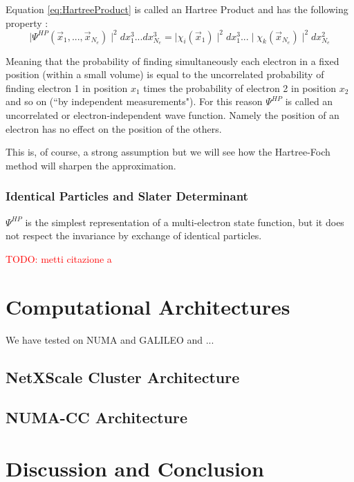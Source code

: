 \documentclass[a4paper,12pt]{article}
\newcommand\mynotes[1]{\begin{flushright}\textcolor{red}{TODO: #1}\end{flushright}}
\begin{document}
Equation \eqref{eq:HartreeProduct} is called an Hartree Product and has the following property :
\begin{equation}\label{eq:uncorrelated}
	\mid\Psi^{HP}(\vec{x}_1,...,\vec{x}_{N_e}) \mid^2 dx_1^3 ... dx_{N_e}^3 = \mid\chi_i(\vec{x}_1)\mid^2 dx_1^3 ...\mid \chi_k(\vec{x}_{N_e})\mid^2 dx_{N_e}^2
\end{equation}

Meaning that the probability of finding simultaneously each electron in a fixed position (within a small volume) is equal to the uncorrelated probability of finding electron 1 in position $x_1$ times the probability of electron 2 in position $x_2$ and so on (``by independent measurements").
For this reason $\Psi^{HP}$ is called an uncorrelated or electron-independent wave function. Namely the position of an electron has no effect on the position of the others. 

This is, of course, a strong assumption but we will see how the Hartree-Foch method will sharpen the approximation.

\subsubsection{Identical Particles and Slater Determinant}

$\Psi^{HP}$ is the simplest representation of a multi-electron state function, but it does not respect the invariance by exchange of identical particles.





\mynotes{metti citazione a \cite{Dan}}



\section{Computational Architectures} \label{comparch:sec}


We have tested on NUMA and GALILEO and ...


\subsection{NetXScale Cluster Architecture}\label{galileoarch:sec}
\subsection{NUMA-CC Architecture}\label{numaarch:sec}


\section{Discussion and Conclusion}
\end{document}
